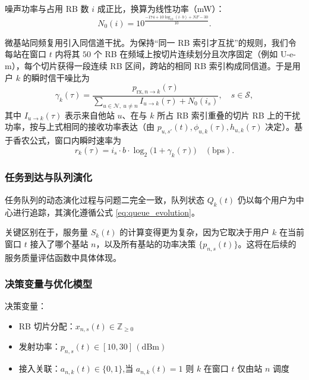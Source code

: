 噪声功率与占用 RB 数 $i$ 成正比，换算为线性功率（mW）：
\begin{equation}
 N_0(i)=10^{\frac{-174+10\log_{10}(i\cdot b)+NF-30}{10}}.
\end{equation}

微基站同频复用引入同信道干扰。为保持“同一 RB 索引才互扰”的规则，我们令每站在窗口 $t$ 内将其 $50$ 个 RB 在频域上按切片连续划分且次序固定（例如 U-e-m），每个切片获得一段连续 RB 区间，跨站的相同 RB 索引构成同信道。于是用户 $k$ 的瞬时信干噪比为
\begin{equation}
 \gamma_k(\tau)=\frac{p_{\mathrm{rx},n\to k}(\tau)}{\sum\limits_{u\in\mathcal{N},\ u\neq n} I_{u\to k}(\tau)+N_0(i_s)},\quad s\in\mathcal{S},
\end{equation}
其中 $I_{u\to k}(\tau)$ 表示来自他站 $u$、在与 $k$ 所占 RB 索引重叠的切片 RB 上的干扰功率，按与上式相同的接收功率表达（由 $p_{u,s'}(t),\phi_{u,k}(\tau),h_{u,k}(\tau)$ 决定）。基于香农公式，窗口内瞬时速率为
\begin{equation}
 r_k(\tau)=i_s\cdot b\cdot \log_2\big(1+\gamma_k(\tau)\big)\quad(\mathrm{bps}).
\end{equation}
\subsubsection{任务到达与队列演化}

任务队列的动态演化过程与问题二完全一致，队列状态 $Q_k(t)$ 仍以每个用户为中心进行追踪，其演化遵循公式 \eqref{eq:queue_evolution}。

关键区别在于，服务量 $S_k(t)$ 的计算变得更为复杂，因为它取决于用户 $k$ 在当前窗口 $t$ 接入了哪个基站 $n$，以及所有基站的功率决策 $\{p_{n,s}(t)\}$。这将在后续的服务质量评估函数中具体体现。


\subsubsection{决策变量与优化模型}

决策变量：
\begin{itemize}
  \item RB 切片分配：$x_{n,s}(t)\in\mathbb{Z}_{\ge 0}$
  \item 发射功率：$p_{n,s}(t)\in[10,30]\,\mathrm{(dBm)}$
  \item 接入关联：$a_{n,k}(t)\in\{0,1\}$,当 $a_{n,k}(t)=1$ 则 $k$ 在窗口 $t$ 仅由站 $n$ 调度
\end{itemize}


